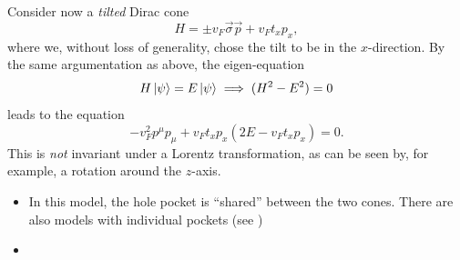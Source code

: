 Consider now a \emph{tilted} Dirac cone
\begin{equation}
  \label{eq:139}
  H = \pm v_F \vec{\sigma} \vec{p} + v_F t_x p_x,
\end{equation}
where we, without loss of generality, chose the tilt to be in the \( x \)-direction.
By the same argumentation as above, the eigen-equation
\[
  H \ket{\psi} = E\ket{\psi} \implies (H^2 - E^2) = 0
\]
leads to the equation
\begin{equation}
  \label{eq:140}
  -v_F^2 p^{\mu} p_{\mu} + v_{F} t_{x} p_x (2 E - v_F t_x p_x) = 0.
\end{equation}
This is \emph{not} invariant under a Lorentz transformation, as can be seen by, for example, a rotation around the \( z \)-axis.


\begin{itemize}
  \item In this model, the hole pocket is ``shared'' between the two cones. There are also models with individual pockets (see \cite{mccormickMinimalModelsTopological2017})
        \item {}
\end{itemize}


